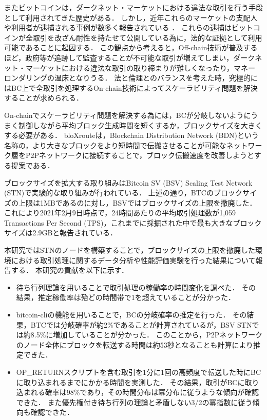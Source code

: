 \documentclass[graybox]{svmult}
\begin{document}
またビットコインは，ダークネット・マーケットにおける違法な取引を行う手段として利用されてきた歴史がある．
しかし，近年これらのマーケットの支配人や利用者が逮捕される事例が数多く報告されている
\cite{silkroad,alphabay,welcome2video}．
これらの逮捕はビットコインが全取引を改ざん耐性を持たせて公開している為に，法的な証拠として利用可能であることに起因する．
この観点から考えると，Off-chain技術が普及するほど，政府等が追跡して監査することが不可能な取引が増えてしまい，ダークネット・マーケットにおける違法な取引の取り締まりが難しくなったり，マネー
ロンダリングの温床となりうる．
法と倫理とのバランスを考えた時，究極的にはBC上で全取引を処理するOn-chain技術によってスケーラビリティ問題を解決することが求められる．

On-chainでスケーラビリティ問題を解決する為には，BCが分岐しないようにうまく制御しながら平均ブロック生成時間を短くするか，ブロックサイズを大きくする必要がある．
bloXroute\cite{bloX}は，Blockchain Distribution Network (BDN)という名称の，より大きなブロックをより短時間で伝搬させることが可能なネットワーク層をP2Pネットワークに接続することで，ブロック伝搬速度を改善しようとする提案である．

ブロックサイズを拡大する取り組みはBitcoin SV (BSV) \cite{bsv} Scaling Test Network (STN)で実験的な取り組みが行われている\cite{bitcoinscaling}．
上述の通り，BTCのブロックサイズの上限は1MBであるのに対し，BSVではブロックサイズの上限を撤廃した．
これにより2021年2月9日時点で，24時間あたりの平均取引処理数が1,059 Transactions Per Second (TPS)，これまでに採掘された中で最も大きなブロックサイズは2.9GBと報告されている．

本研究ではSTNのノードを構築することで，ブロックサイズの上限を撤廃した環境における取引処理に関するデータ分析や性能評価実験を行った結果について報告する．
本研究の貢献を以下に示す．
%
\begin{itemize}
  \item 待ち行列理論を用いることで取引処理の稼働率の時間変化を調べた．
	その結果，推定稼働率は殆どの時間帯で1を超えていることが分かった．
  \item bitcoin-cliの機能を用いることで，BCの分岐確率の推定を行った．
	その結果，BTCでは分岐確率が約2\%であることが計算されているが，BSV STNでは約8.5\%に増加していることが分かった．
	このことから，P2Pネットワークのノード全体にブロックを転送する時間は約53秒となることも計算により推定できた．
  \item OP\_RETURNスクリプトを含む取引を1分に1回の高頻度で転送した時にBCに取り込まれるまでにかかる時間を実測した．
	その結果，取引がBCに取り込まれる確率は98\%であり，その時間分布は冪分布に従うような傾向が確認できた．
	また優先権付き待ち行列の理論と矛盾しない3/2の冪指数に従う傾向も確認できた．
\end{itemize}
%
\end{document}
